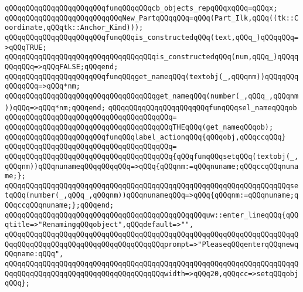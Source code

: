 \verb|qQQqqQQqqQQqqQQqqQQqqQQqfunqQQqqQQqcb_objects_repqQQqxqQQq=qQQqx;|\newline
\newline
\verb|qQQqqQQqqQQqqQQqqQQqqQQqqQQqNew_PartqQQqqQQq=qQQq(Part_Ilk,qQQq((tk::Coordinate,qQQqtk::Anchor_Kind)));|\newline
\newline
\verb|qQQqqQQqqQQqqQQqqQQqqQQqfunqQQqis_constructedqQQq(text,qQQq_)qQQqqQQq=>qQQqTRUE;|\newline
\verb|qQQqqQQqqQQqqQQqqQQqqQQqqQQqqQQqqQQqis_constructedqQQq(num,qQQq_)qQQqqQQqqQQq=>qQQqFALSE;qQQqend;|\newline
\newline
\verb|qQQqqQQqqQQqqQQqqQQqqQQqfunqQQqget_nameqQQq(textobj(_,qQQqnm))qQQqqQQqqQQqqQQq=>qQQq*nm;|\newline
\verb|qQQqqQQqqQQqqQQqqQQqqQQqqQQqqQQqqQQqget_nameqQQq(number(_,qQQq_,qQQqnm))qQQq=>qQQq*nm;qQQqend;|\newline
\newline
\verb|qQQqqQQqqQQqqQQqqQQqqQQqfunqQQqsel_nameqQQqob|\newline
\verb|qQQqqQQqqQQqqQQqqQQqqQQqqQQqqQQqqQQqqQQq=|\newline
\verb|qQQqqQQqqQQqqQQqqQQqqQQqqQQqqQQqqQQqqQQqTHEqQQq(get_nameqQQqob);|\newline
\newline
\verb|qQQqqQQqqQQqqQQqqQQqqQQqfunqQQqlabel_actionqQQq{qQQqobj,qQQqccqQQq}|\newline
\verb|qQQqqQQqqQQqqQQqqQQqqQQqqQQqqQQqqQQqqQQq=|\newline
\verb|qQQqqQQqqQQqqQQqqQQqqQQqqQQqqQQqqQQqqQQq{qQQqfunqQQqsetqQQq(textobj(_,qQQqnm))qQQqnunameqQQqqQQqqQQq=>qQQq{qQQqnm:=qQQqnuname;qQQqccqQQqnuname;};|\newline
\verb|qQQqqQQqqQQqqQQqqQQqqQQqqQQqqQQqqQQqqQQqqQQqqQQqqQQqqQQqqQQqqQQqqQQqsetqQQq(number(_,qQQq_,qQQqnm))qQQqnunameqQQq=>qQQq{qQQqnm:=qQQqnuname;qQQqccqQQqnuname;};qQQqend;|\newline
\verb|qQQqqQQqqQQqqQQqqQQqqQQqqQQqqQQqqQQqqQQqqQQqqQQquw::enter_lineqQQq{qQQqtitle=>"RenamingqQQqobject",qQQqdefault=>"",|\newline
\verb|qQQqqQQqqQQqqQQqqQQqqQQqqQQqqQQqqQQqqQQqqQQqqQQqqQQqqQQqqQQqqQQqqQQqqQQqqQQqqQQqqQQqqQQqqQQqqQQqqQQqqQQqqQQqprompt=>"PleaseqQQqenterqQQqnewqQQqname:qQQq",|\newline
\verb|qQQqqQQqqQQqqQQqqQQqqQQqqQQqqQQqqQQqqQQqqQQqqQQqqQQqqQQqqQQqqQQqqQQqqQQqqQQqqQQqqQQqqQQqqQQqqQQqqQQqqQQqqQQqwidth=>qQQq20,qQQqcc=>setqQQqobjqQQq};|\newline
